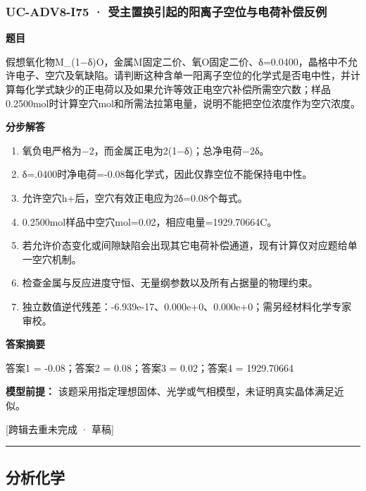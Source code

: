 \documentclass[UTF8,11pt,a4paper]{ctexart}
\begin{document}
\subsubsection*{UC-ADV8-I75 · 受主置换引起的阳离子空位与电荷补偿反例}
\noindent\textbf{题目}\par
假想氧化物M\_(1−δ)O，金属M固定二价、氧O固定二价、δ=0.0400，晶格中不允许电子、空穴及氧缺陷。请判断这种含单一阳离子空位的化学式是否电中性，并计算每化学式缺少的正电荷以及如果允许等效正电空穴补偿所需空穴数；样品0.2500mol时计算空穴mol和所需法拉第电量，说明不能把空位浓度作为空穴浓度。\par
\medskip\noindent\textbf{分步解答}
\begin{enumerate}
\item 氧负电严格为−2，而金属正电为2(1−δ)；总净电荷−2δ。
\item δ=.0400时净电荷=-0.08每化学式，因此仅靠空位不能保持电中性。
\item 允许空穴h+后，空穴有效正电应为2δ=0.08个每式。
\item 0.2500mol样品中空穴mol=0.02，相应电量=1929.70664C。
\item 若允许价态变化或间隙缺陷会出现其它电荷补偿通道，现有计算仅对应题给单一空穴机制。
\item 检查金属与反应进度守恒、无量纲参数以及所有占据量的物理约束。
\item 独立数值逆代残差：-6.939e-17、0.000e+0、0.000e+0；需另经材料化学专家审校。
\end{enumerate}
\noindent\textbf{答案摘要}\par
答案1 = -0.08；答案2 = 0.08；答案3 = 0.02；答案4 = 1929.70664\par
\noindent\textbf{模型前提：}
该题采用指定理想固体、光学或气相模型，未证明真实晶体满足近似。\par
\noindent\textcolor{red!65!black}{[跨辑去重未完成 · 草稿]} \par
\medskip\hrule\medskip
\subsection*{分析化学}
\end{document}
